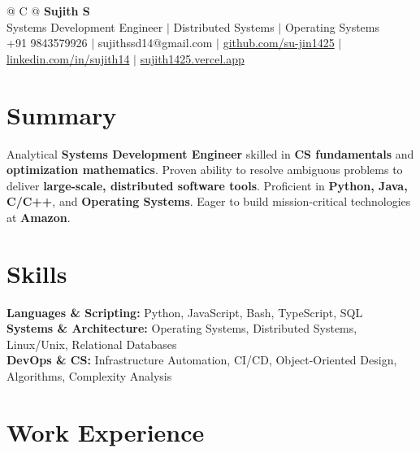 \documentclass[a4paper,10pt]{article}
\newcommand{\ulink}[2]{\href{#1}{#2}}
\begin{document}
\pagestyle{empty}

\begin{tabularx}{\linewidth}{@{} C @{}}
{\color[HTML]{000000}\fontsize{30}{35}\selectfont\bfseries Sujith S} \\[5pt]
{\fontsize{10.5}{12.5}\selectfont\color[HTML]{3A3A3A}
Systems Development Engineer $|$ Distributed Systems $|$ Operating Systems} \\[6pt]
{\fontsize{9.5}{11.5}\selectfont\textcolor[HTML]{3A3A3A}{+91 9843579926 $|$ sujithssd14@gmail.com $|$ \ulink{https://github.com/su-jin1425}{github.com/su-jin1425} $|$ \ulink{https://linkedin.com/in/sujith14}{linkedin.com/in/sujith14} $|$ \ulink{https://sujith1425.vercel.app}{sujith1425.vercel.app}}}
\end{tabularx}

\section{Summary}
\vspace{2pt}

{\color[HTML]{0A0A0A}\fontsize{11}{14}\selectfont
Analytical \textbf{Systems Development Engineer} skilled in \textbf{CS fundamentals} and \textbf{optimization mathematics}. Proven ability to resolve ambiguous problems to deliver \textbf{large-scale, distributed software tools}. Proficient in \textbf{Python, Java, C/C++}, and \textbf{Operating Systems}. Eager to build mission-critical technologies at \textbf{Amazon}.}

\section{Skills}
\vspace{2pt}

{\color[HTML]{0A0A0A}\fontsize{11}{14}\selectfont
\textbf{Languages \& Scripting:} Python, JavaScript, Bash, TypeScript, SQL \\[2pt]
\textbf{Systems \& Architecture:} Operating Systems, Distributed Systems, Linux/Unix, Relational Databases \\[2pt]
\textbf{DevOps \& CS:} Infrastructure Automation, CI/CD, Object-Oriented Design, Algorithms, Complexity Analysis}

\section{Work Experience}
\vspace{2pt}
\end{document}
